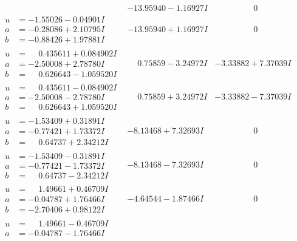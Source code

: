 \documentclass[1p]{elsarticle_modified}
\theoremstyle{definition}
\begin{document}
$$\begin{array}{c|c|c}
 & -13.95940 - 1.16927 I & \phantom{-0.000000 } 0 \\ \hline\begin{aligned}
u &= -1.55026 - 0.04901 I \\
a &= -0.28086 + 2.10795 I \\
b &= -0.88426 + 1.97881 I\end{aligned}
 & -13.95940 + 1.16927 I & \phantom{-0.000000 } 0 \\ \hline\begin{aligned}
u &= \phantom{-}0.435611 + 0.084902 I \\
a &= -2.50008 + 2.78780 I \\
b &= \phantom{-}0.626643 - 1.059520 I\end{aligned}
 & \phantom{-}0.75859 - 3.24972 I & -3.33882 + 7.37039 I \\ \hline\begin{aligned}
u &= \phantom{-}0.435611 - 0.084902 I \\
a &= -2.50008 - 2.78780 I \\
b &= \phantom{-}0.626643 + 1.059520 I\end{aligned}
 & \phantom{-}0.75859 + 3.24972 I & -3.33882 - 7.37039 I \\ \hline\begin{aligned}
u &= -1.53409 + 0.31891 I \\
a &= -0.77421 + 1.73372 I \\
b &= \phantom{-}0.64737 + 2.34212 I\end{aligned}
 & -8.13468 + 7.32693 I & \phantom{-0.000000 } 0 \\ \hline\begin{aligned}
u &= -1.53409 - 0.31891 I \\
a &= -0.77421 - 1.73372 I \\
b &= \phantom{-}0.64737 - 2.34212 I\end{aligned}
 & -8.13468 - 7.32693 I & \phantom{-0.000000 } 0 \\ \hline\begin{aligned}
u &= \phantom{-}1.49661 + 0.46709 I \\
a &= -0.04787 + 1.76466 I \\
b &= -2.70406 + 0.98122 I\end{aligned}
 & -4.64544 - 1.87466 I & \phantom{-0.000000 } 0 \\ \hline\begin{aligned}
u &= \phantom{-}1.49661 - 0.46709 I \\
a &= -0.04787 - 1.76466 I \\

\end{aligned}
\end{array}$$
\end{document}
